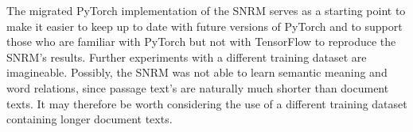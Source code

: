 The migrated PyTorch implementation of the SNRM serves as a starting point
    to make it easier to keep up to date with future versions of PyTorch
    and to support those who are familiar with PyTorch but not with TensorFlow
    to reproduce the SNRM's results.
Further experiments with a different training dataset are imagineable.
Possibly, the SNRM was not able to learn semantic meaning and word relations,
    since passage text's are naturally much shorter than document texts.
It may therefore be worth considering the use of a different training dataset 
    containing longer document texts.